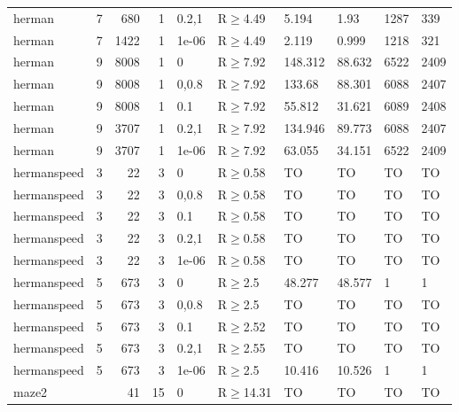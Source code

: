 \begin{longtable}{llrrllllll}
 herman        & 7         &    	680 &    1 & 0.2,1 & R$\geq$4.49  & 5.194    & 1.93     & 1287    & 339     \\
 herman        & 7         &   	1422 &    1 & 1e-06 & R$\geq$4.49  & 2.119    & 0.999    & 1218    & 321     \\
 herman        & 9         &   	8008 &    1 & 0     & R$\geq$7.92  & 148.312  & 88.632   & 6522    & 2409    \\
 herman        & 9         &   	8008 &    1 & 0,0.8 & R$\geq$7.92  & 133.68   & 88.301   & 6088    & 2407    \\
 herman        & 9         &   	8008 &    1 & 0.1   & R$\geq$7.92  & 55.812   & 31.621   & 6089    & 2408    \\
 herman        & 9         &   	3707 &    1 & 0.2,1 & R$\geq$7.92  & 134.946  & 89.773   & 6088    & 2407    \\
 herman        & 9         &   	3707 &    1 & 1e-06 & R$\geq$7.92  & 63.055   & 34.151   & 6522    & 2409    \\
 hermanspeed   & 3         &     	22 &    3 & 0     & R$\geq$0.58  & TO       & TO       & TO      & TO      \\
 hermanspeed   & 3         &     	22 &    3 & 0,0.8 & R$\geq$0.58  & TO       & TO       & TO      & TO      \\
 hermanspeed   & 3         &     	22 &    3 & 0.1   & R$\geq$0.58  & TO       & TO       & TO      & TO      \\
 hermanspeed   & 3         &     	22 &    3 & 0.2,1 & R$\geq$0.58  & TO       & TO       & TO      & TO      \\
 hermanspeed   & 3         &     	22 &    3 & 1e-06 & R$\geq$0.58  & TO       & TO       & TO      & TO      \\
 hermanspeed   & 5         &    	673 &    3 & 0     & R$\geq$2.5   & 48.277   & 48.577   & 1       & 1       \\
 hermanspeed   & 5         &    	673 &    3 & 0,0.8 & R$\geq$2.5   & TO       & TO       & TO      & TO      \\
 hermanspeed   & 5         &    	673 &    3 & 0.1   & R$\geq$2.52  & TO       & TO       & TO      & TO      \\
 hermanspeed   & 5         &    	673 &    3 & 0.2,1 & R$\geq$2.55  & TO       & TO       & TO      & TO      \\
 hermanspeed   & 5         &    	673 &    3 & 1e-06 & R$\geq$2.5   & 10.416   & 10.526   & 1       & 1       \\
 maze2         &           &     	41 &   15 & 0     & R$\geq$14.31 & TO       & TO       & TO      & TO      \\

\end{longtable}
